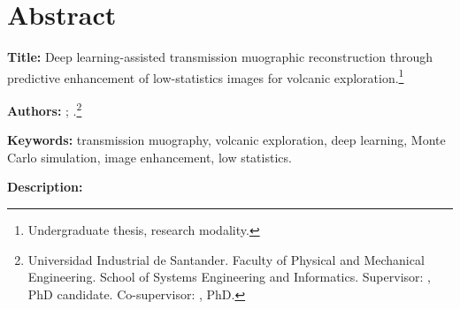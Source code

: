 \chapter*{Abstract}
\label{pre:abstract}

\begingroup
{}
\setlength{\parindent}{0pt}
\setlength{\parskip}{0.7em}

\textbf{Title:} Deep learning-assisted transmission muographic reconstruction through predictive enhancement of low-statistics images for volcanic exploration.\footnote{Undergraduate thesis, research modality.}

\textbf{Authors:} \AutorUno; \AutorDos.\footnote{Universidad Industrial de Santander. Faculty of Physical and Mechanical Engineering. School of Systems Engineering and Informatics. Supervisor: \DirectorNombre, PhD candidate. Co-supervisor: \CodirectorNombre, PhD.}

\textbf{Keywords:} transmission muography, volcanic exploration, deep learning, Monte Carlo simulation, image enhancement, low statistics.

\textbf{Description:}

